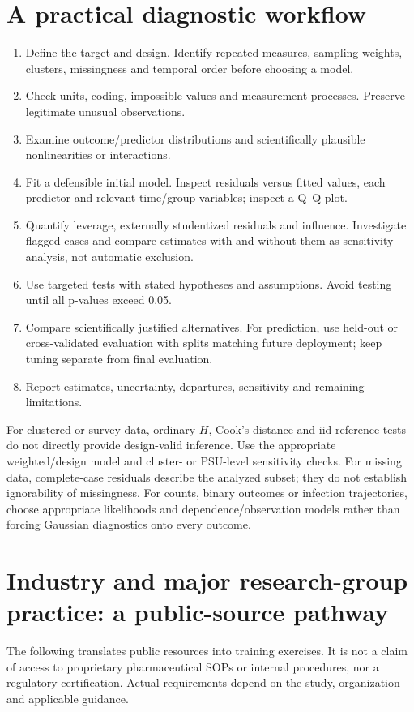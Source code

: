 \documentclass[11pt]{article}
\begin{document}
\section{A practical diagnostic workflow}
\begin{enumerate}
\item Define the target and design. Identify repeated measures, sampling weights, clusters, missingness and temporal order before choosing a model.
\item Check units, coding, impossible values and measurement processes. Preserve legitimate unusual observations.
\item Examine outcome/predictor distributions and scientifically plausible nonlinearities or interactions.
\item Fit a defensible initial model. Inspect residuals versus fitted values, each predictor and relevant time/group variables; inspect a Q--Q plot.
\item Quantify leverage, externally studentized residuals and influence. Investigate flagged cases and compare estimates with and without them as sensitivity analysis, not automatic exclusion.
\item Use targeted tests with stated hypotheses and assumptions. Avoid testing until all p-values exceed 0.05.
\item Compare scientifically justified alternatives. For prediction, use held-out or cross-validated evaluation with splits matching future deployment; keep tuning separate from final evaluation.
\item Report estimates, uncertainty, departures, sensitivity and remaining limitations.
\end{enumerate}
For clustered or survey data, ordinary $H$, Cook's distance and iid reference tests do not directly provide design-valid inference. Use the appropriate weighted/design model and cluster- or PSU-level sensitivity checks. For missing data, complete-case residuals describe the analyzed subset; they do not establish ignorability of missingness. For counts, binary outcomes or infection trajectories, choose appropriate likelihoods and dependence/observation models rather than forcing Gaussian diagnostics onto every outcome.

\section{Industry and major research-group practice: a public-source pathway}
The following translates public resources into training exercises. It is not a claim of access to proprietary pharmaceutical SOPs or internal procedures, nor a regulatory certification. Actual requirements depend on the study, organization and applicable guidance.
\end{document}
